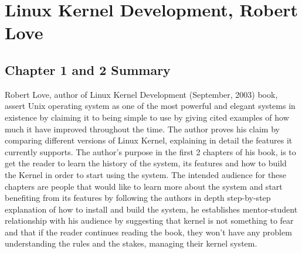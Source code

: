 \documentclass[letterpaper,10pt,titlepage]{article}
\begin{document}
\section*{Linux Kernel Development, Robert Love}
\subsection*{Chapter 1 and 2 Summary}

Robert Love, author of Linux Kernel Development (September, 2003) book, assert Unix operating system as one of the most powerful and elegant systems in existence by claiming it to being simple to use by giving cited examples of how much it have improved throughout the time. The author proves his claim by comparing different versions of Linux Kernel, explaining in detail the features it currently supports. The author’s purpose in the first 2 chapters of his book, is to get the reader to learn the history of the system, its features and how to build the Kernel in order to start using the system. The intended audience for these chapters are people that would like to learn more about the system and start benefiting from its features by following the authors in depth step-by-step explanation of how to install and build the system, he establishes mentor-student relationship with his audience by suggesting that kernel is not something to fear and that if the reader continues reading the book, they won’t have any problem understanding the rules and the stakes, managing their kernel system.
\end{document}

